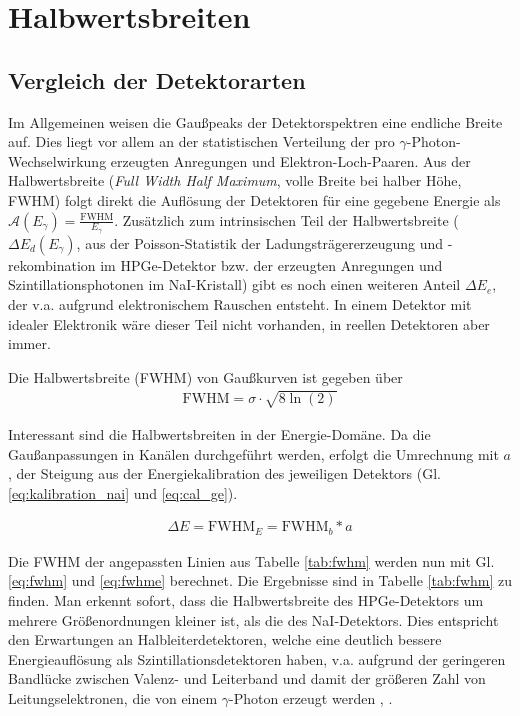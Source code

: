 \chapter{Halbwertsbreiten}

\section{Vergleich der Detektorarten}

Im Allgemeinen weisen die Gaußpeaks der Detektorspektren eine endliche Breite auf. Dies liegt vor allem an der statistischen Verteilung der pro $\gamma$-Photon-Wechselwirkung erzeugten Anregungen und Elektron-Loch-Paaren. Aus der Halbwertsbreite (\textit{Full Width Half Maximum}, volle Breite bei halber Höhe, FWHM) folgt direkt die Auflösung der Detektoren für eine gegebene Energie als $\mathcal{A}(E_\gamma) = \frac{\text{FWHM}}{E_\gamma}$. Zusätzlich zum intrinsischen Teil der Halbwertsbreite ($\Delta E_d(E_\gamma)$, aus der Poisson-Statistik der Ladungsträgererzeugung und -rekombination im HPGe-Detektor bzw. der erzeugten Anregungen und Szintillationsphotonen im NaI-Kristall) gibt es noch einen weiteren Anteil $\Delta E_e$, der v.a. aufgrund elektronischem Rauschen entsteht. In einem Detektor mit idealer Elektronik wäre dieser Teil nicht vorhanden, in reellen Detektoren aber immer.

Die Halbwertsbreite (FWHM) von Gaußkurven ist gegeben über \cite[521]{gammahandbook}
\begin{align}
	\text{FWHM} = \sigma \cdot \sqrt{8 \ln(2)} \label{eq:fwhm}
\end{align}

Interessant sind die Halbwertsbreiten in der Energie-Domäne. Da die Gaußanpassungen in Kanälen durchgeführt werden, erfolgt die Umrechnung mit $a$, der Steigung aus der Energiekalibration des jeweiligen Detektors (Gl. \ref{eq:kalibration_nai} und \ref{eq:cal_ge}).

\begin{align}
	\Delta E = \text{FWHM}_E = \text{FWHM}_b * a \label{eq:fwhme}
\end{align}


Die FWHM der angepassten Linien aus Tabelle \ref{tab:fwhm} werden nun mit Gl. \eqref{eq:fwhm} und \eqref{eq:fwhme} berechnet. Die Ergebnisse sind in Tabelle \ref{tab:fwhm} zu finden. Man erkennt sofort, dass die Halbwertsbreite des HPGe-Detektors um mehrere Größenordnungen kleiner ist, als die des NaI-Detektors. Dies entspricht den Erwartungen an Halbleiterdetektoren, welche eine deutlich bessere Energieauflösung als Szintillationsdetektoren haben, v.a. aufgrund der geringeren Bandlücke zwischen Valenz- und Leiterband und damit der größeren Zahl von Leitungselektronen, die von einem $\gamma$-Photon erzeugt werden \cite[117]{leotechniques}, \cite[570]{gammahandbook}.


